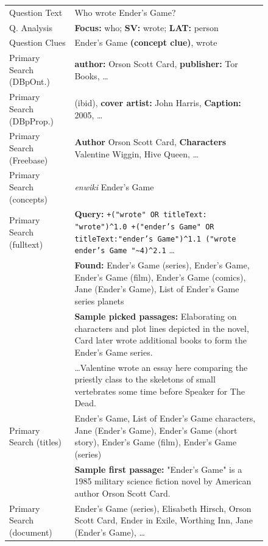 \begin{figure}[t!]
\renewcommand{\arraystretch}{1.3}
\centering
\footnotesize
\begin{tabular}{|p{1.8cm}p{6cm}|}
\hline
Question Text & Who wrote Ender's Game? \\
Q. Analysis & \textbf{Focus:} who; \textbf{SV:} wrote; \textbf{LAT:} person \\
Question Clues & Ender's Game \textbf{(concept clue)}, wrote \\ \hline

Primary Search (DBpOnt.) & \textbf{author:} Orson Scott Card, \textbf{publisher:} Tor Books, \dots \\
Primary Search (DBpProp.) & (ibid), \textbf{cover artist:} John Harris, \textbf{Caption:} 2005, \dots \\
Primary Search (Freebase) & \textbf{Author} Orson Scott Card, \textbf{Characters} Valentine Wiggin, Hive Queen, \dots \\
Primary Search (concepts) & \textit{enwiki} Ender's Game \\
Primary Search (fulltext) %
	& \textbf{Query:} \texttt{+("wrote" OR titleText: "wrote")\^{}1.0 +("ender's Game" OR titleText:"ender's Game")\^{}1.1  ("wrote ender's Game "\textasciitilde4)\^{}2.1} \dots \\
	& \textbf{Found:} Ender's Game (series), Ender's Game, Ender's Game (film), Ender's Game (comics), Jane (Ender's Game), List of Ender's Game series planets \\
	& \textbf{Sample picked passages:} {\footnotesize Elaborating on characters and plot lines depicted in the novel, Card later wrote additional books to form the Ender's Game series.} \\
	& \dots {\footnotesize Valentine wrote an essay here comparing the priestly class to the skeletons of small vertebrates some time before Speaker for The Dead.} \\
Primary Search (titles) & Ender's Game, List of Ender's Game characters, Jane (Ender's Game), Ender's Game (short story), Ender's Game (film), Ender's Game (series) \\
	& \textbf{Sample first passage:} {\footnotesize "Ender's Game" is a 1985 military science fiction novel by American author Orson Scott Card.} \\
Primary Search (document) & Ender's Game (series), Elisabeth Hirsch, Orson Scott Card, Ender in Exile, Worthing Inn, Jane (Ender's Game), \dots \\ \hline


\end{tabular}
\end{figure}
